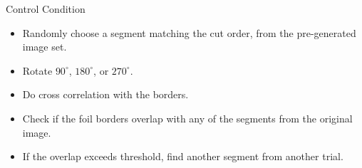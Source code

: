\documentclass[10pt,xcolor=svgnames]{beamer} %
\begin{document}
\begin{frame}{Control Condition}
    \begin{itemize}
        \item Randomly choose a segment matching the cut order, from the pre-generated image set.
        \item Rotate  $90^\circ$, $180^\circ$, or $270^\circ$. 
        \item Do cross correlation with the borders.
        \item Check if the foil borders overlap with any of the segments from the original image.  
        \item If the overlap exceeds threshold, find another segment from another trial.
    \end{itemize}
\end{frame}
\end{document}
